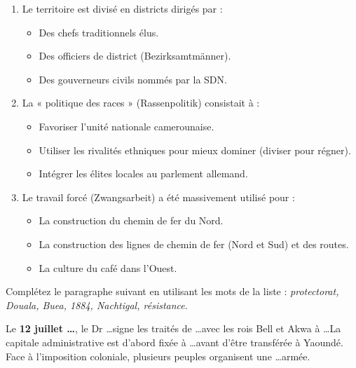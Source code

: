 \documentclass[11pt]{article}
\begin{document}
\begin{exercice}
\begin{enumerate}
    \item Le territoire est divisé en districts dirigés par :
    \begin{itemize}
        \item[A.] Des chefs traditionnels élus.
        \item[B.] Des officiers de district (Bezirksamtmänner).
        \item[C.] Des gouverneurs civils nommés par la SDN.
    \end{itemize}
    \item La « politique des races » (Rassenpolitik) consistait à :
    \begin{itemize}
        \item[A.] Favoriser l'unité nationale camerounaise.
        \item[B.] Utiliser les rivalités ethniques pour mieux dominer (diviser pour régner).
        \item[C.] Intégrer les élites locales au parlement allemand.
    \end{itemize}
    \item Le travail forcé (Zwangsarbeit) a été massivement utilisé pour :
    \begin{itemize}
        \item[A.] La construction du chemin de fer du Nord.
        \item[B.] La construction des lignes de chemin de fer (Nord et Sud) et des routes.
        \item[C.] La culture du café dans l'Ouest.
    \end{itemize}
\end{enumerate}
\end{exercice}

\begin{exercice}
Complétez le paragraphe suivant en utilisant les mots de la liste : \textit{protectorat, Douala, Buea, 1884, Nachtigal, résistance}.

Le \textbf{12 juillet \ldots}, le Dr \ldots signe les traités de \ldots avec les rois Bell et Akwa à \ldots La capitale administrative est d'abord fixée à \ldots avant d'être transférée à Yaoundé. Face à l'imposition coloniale, plusieurs peuples organisent une \ldots armée.
\end{exercice}
\end{document}
